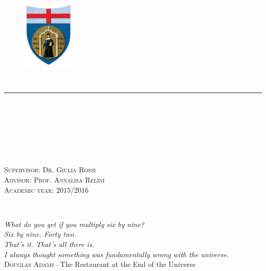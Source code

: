 \documentclass[a4paper,11pt,cleardoubleempty,bibliography=totoc]{scrbook}
\numberwithin{equation}{section}
\begin{document}
\frontmatter
\pagestyle{scrheadings}
\clearscrheadfoot
\rohead{\pagemark}
\lehead{\pagemark\qquad\leftmark}

%
\begin{titlepage}
\begin{center}
	\begin{figure}[h!t]
		\center
		\includegraphics[width=0.22\textwidth]{./unige.png}
	\end{figure}
	\\
	\noindent\rule{\textwidth}{0.5pt}\\
	\\
	~\\[3cm]
	\begin{doublespacing}
    	{\textcolor{BrickRed}{\large{}}\par}%
	\end{doublespacing}
	~\\[3cm]
     \\
\end{center}
\vfill
\begin{doublespacing}
	\noindent%
	\textsc{\sffamily Supervisor: Dr. Giulia Rossi}\\%
	\textsc{\sffamily Advisor: Prof. Annalisa Relini}\\%
	\textsc{\sffamily Academic year: $2015/2016$}\par
\end{doublespacing}
\end{titlepage}
\restoregeometry

\cleardoublepage
~\\[3cm]
\begin{flushright}\footnotesize
	\textsl{What do you get if you multiply six by nine?}\\
	\textsl{Six by nine. Forty two.}\\
	\textsl{That's it. That's all there is.}\\
	\textsl{I always thought something was fundamentally wrong with the universe.}\\\medskip
	\textsc{\sffamily Douglas Adams}\,--\,\textsf{The Restaurant at the End of the Universe}
\end{flushright}
\vfill
\end{document}
